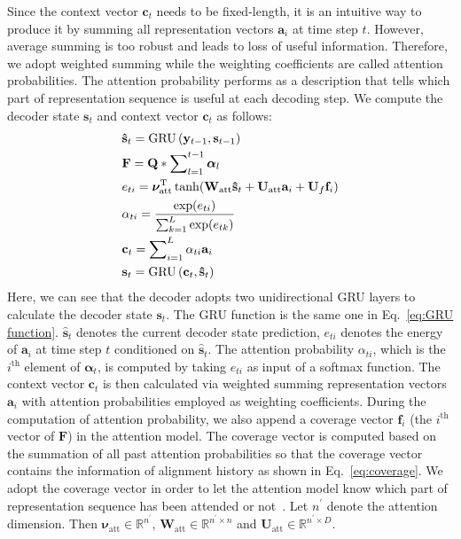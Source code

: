 \documentclass[a4paper,conference]{IEEEtran}
\begin{document}
Since the context vector ${\mathbf{c}_t}$ needs to be fixed-length, it is an intuitive way to produce it by summing all representation vectors ${\mathbf{a}_i}$ at time step $t$. However, average summing is too robust and leads to loss of useful information. Therefore, we adopt weighted summing while the weighting coefficients are called attention probabilities. The attention probability performs as a description that tells which part of representation sequence is useful at each decoding step. We compute the decoder state ${\mathbf{s}_t}$ and context vector ${\mathbf{c}_t}$ as follows:
\begin{align}\label{eq:decoder with attention}
 & {{\mathbf{\hat s}}_t} = \textrm{GRU} \left( {{\bf{y}}_{t-1}}, {{\bf{s}}_{t - 1}} \right) \\
 & {\mathbf{F}} = {\mathbf{Q}} * \sum\nolimits_{l=1}^{t - 1} {{{\bm{\alpha}}_l}} \label{eq:coverage} \\
 & {e_{ti}} = {\bm{\nu }}_{\text{att}}^{\rm T}\tanh ({{\mathbf{W}}_{\text{att}}}{{\mathbf{\hat s}}_t} + {{\mathbf{U}}_{\text{att}}}{{\mathbf{a}}_i} + {{\mathbf{U}}_f}{{\mathbf{f}}_i}) \\
 & {\alpha _{ti}} = \frac{{\exp ({e_{ti}})}}{{\sum\nolimits_{k = 1}^L {\exp ({e_{tk}})} }} \\
 & {{\mathbf{c}}_t} = \sum\nolimits_{i=1}^L {{\alpha _{ti}}{{\mathbf{a}}_i}} \\
 & {{\mathbf{s}}_t} = \textrm{GRU} \left( {{\mathbf{c}}_t}, {{\mathbf{\hat s}}_t} \right)
\end{align}
Here, we can see that the decoder adopts two unidirectional GRU layers to calculate the decoder state ${\mathbf{s}_t}$. The GRU function is the same one in Eq.~\eqref{eq:GRU function}. ${{\mathbf{\hat s}}_t}$ denotes the current decoder state prediction, ${{e}_{ti}}$ denotes the energy of ${\mathbf{a}_i}$ at time step $t$ conditioned on ${\mathbf{\hat s}_t}$. The attention probability ${{\alpha}_{ti}}$, which is the $i^{\text{th}}$ element of $\bm{\alpha}_t$, is computed by taking ${{e}_{ti}}$ as input of a softmax function. The context vector ${\mathbf{c}_t}$ is then calculated via weighted summing representation vectors ${\mathbf{a}_i}$ with attention probabilities employed as weighting coefficients. During the computation of attention probability, we also append a coverage vector ${\mathbf{f}_i}$ (the $i^{\text{th}}$ vector of $\mathbf{F}$) in the attention model. The coverage vector is computed based on the summation of all past attention probabilities so that the coverage vector contains the information of alignment history as shown in Eq.~\eqref{eq:coverage}. We adopt the coverage vector in order to let the attention model know which part of representation sequence has been attended or not~\cite{tu2016modeling}. Let $n^{'}$ denote the attention dimension. Then ${{\bm{\nu }}_{\text{att}}} \in {\mathbb{R}^{{n^{'}}}}$, ${{\mathbf{W}}_{\text{att}}} \in {\mathbb{R}^{{n^{'}} \times n}}$ and ${{\mathbf{U}}_{\text{att}}} \in {\mathbb{R}^{{n^{'}} \times D}}$.
\end{document}
